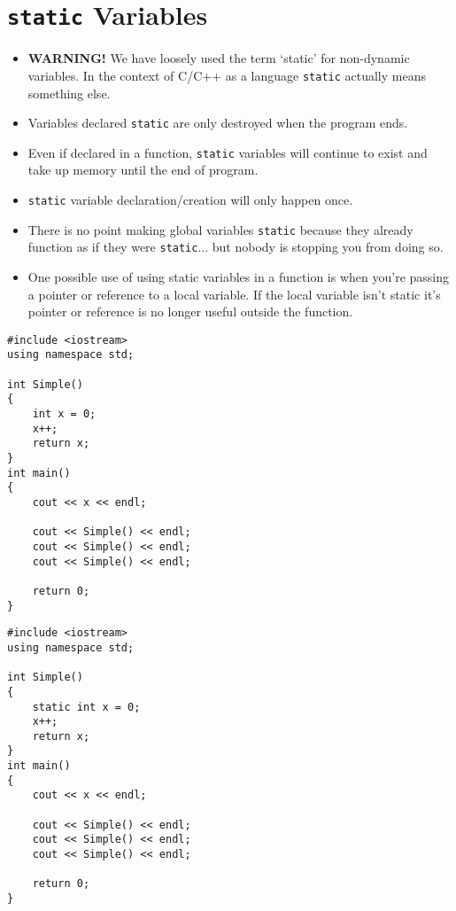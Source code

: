 \documentclass[12pt,a4paper]{article}
\begin{document}
\section{\texttt{static} Variables}
\begin{itemize}
\item \textbf{WARNING!} We have loosely used the term `static' for non-dynamic variables. In the context of C/C++ as a language \verb|static| actually means something else.
\item Variables declared \verb|static| are only destroyed when the program ends.
\item Even if declared in a function, \verb|static| variables will continue to exist and take up memory until the end of program.
\item \verb|static| variable declaration/creation will only happen once.
\item There is no point making global variables \verb|static| because they already function as if they were \verb|static|... but nobody is stopping you from doing so.
\item One possible use of using static variables in a function is when you're passing a pointer or reference to a local variable. If the local variable isn't static it's pointer or reference is no longer useful outside the function.
\end{itemize}
\begin{minipage}{7.5cm}
\begin{lstlisting}[caption={Local Variable in a Function}]
#include <iostream>
using namespace std;

int Simple()
{
	int x = 0;
	x++;
	return x;
}
int main()
{
	cout << x << endl;

	cout << Simple() << endl;
	cout << Simple() << endl;
	cout << Simple() << endl;
	
	return 0;
}
\end{lstlisting}
\end{minipage}
\hspace*{1cm}
\begin{minipage}{7.5cm}
\begin{lstlisting}[caption={\texttt{static} Local Variable in a Function}]
#include <iostream>
using namespace std;

int Simple()
{
	static int x = 0;
	x++;
	return x;
}
int main()
{
	cout << x << endl;

	cout << Simple() << endl;
	cout << Simple() << endl;
	cout << Simple() << endl;
	
	return 0;
}
\end{lstlisting}
\end{minipage}
\end{document}
